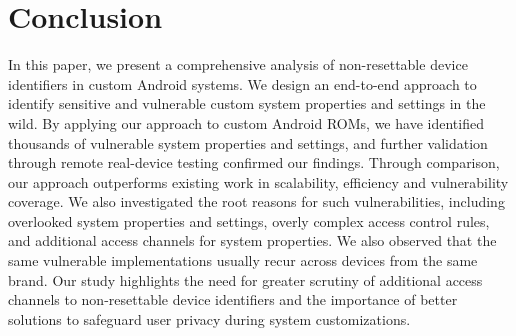 \section{Conclusion}
\label{sec:conclusion}
In this paper, we present a comprehensive analysis of non-resettable device identifiers in custom Android systems. We design an end-to-end approach to identify sensitive and vulnerable custom system properties and settings in the wild. 
By applying our approach to \datasetsize custom Android ROMs, we have identified thousands of vulnerable system properties and settings, and further validation through remote real-device testing confirmed our findings.
Through comparison, our approach outperforms existing work in scalability, efficiency and vulnerability coverage.
We also investigated the root reasons for such vulnerabilities, including overlooked system properties and settings, overly complex access control rules, and additional access channels for system properties. We also observed that the same vulnerable implementations usually recur across devices from the same brand.
Our study highlights the need for greater scrutiny of additional access channels to non-resettable device identifiers and the importance of better solutions to safeguard user privacy during system customizations.